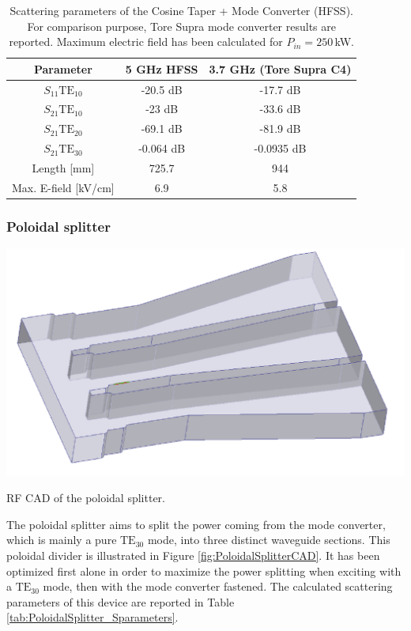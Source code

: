 \begin{table}[h]
	\begin{centering}
		\begin{tabular}{|c|c|c|}
			\hline 
			Parameter & \multicolumn{1}{c|}{5 GHz HFSS } & 3.7 GHz (Tore Supra C4) \tabularnewline
			\hline 
			\hline 
			$S_{11}$$\mbox{TE}_{10}$  & -20.5 dB  & -17.7 dB\tabularnewline
			\hline 
			$S_{21}$$\mbox{TE}_{10}$ & -23 dB  & -33.6 dB\tabularnewline
			\hline 
			$S_{21}$$\mbox{TE}_{20}$ & -69.1 dB  & -81.9 dB\tabularnewline
			\hline 
			$S_{21}$$\mbox{TE}_{30}$ & -0.064 dB  & -0.0935 dB\tabularnewline
			\hline 
			Length {[}mm{]} & \multicolumn{1}{c|}{725.7} & 944\tabularnewline
			\hline 
			Max. E-field {[}kV/cm{]} & \multicolumn{1}{c|}{6.9 } & 5.8\tabularnewline
			\hline 
		\end{tabular}
		\par\end{centering}
	
	\caption{Scattering parameters of the Cosine Taper + Mode Converter (HFSS). For comparison purpose, Tore Supra mode converter results are reported. Maximum electric field has been calculated for $P_{in}=250$\,kW.\label{tab:S-ParametersALL}}
\end{table}


\subsubsection{Poloidal splitter}
\begin{marginfigure}
	\includegraphics[width=1.0\textwidth]{figures/chap3/ITER_modeconverter/HFSS_PoloidalJunction}
	\caption{RF CAD of the poloidal splitter.}
	\label{fig:PoloidalSplitterCAD}
\end{marginfigure}
The poloidal splitter aims to split the power coming from the mode converter, which is mainly a pure $\mbox{TE}_{30}$ mode, into three distinct waveguide sections. This poloidal divider is illustrated in Figure \ref{fig:PoloidalSplitterCAD}. It has been optimized first alone in order to maximize the power splitting when exciting with a $\mbox{TE}_{30}$ mode, then with the mode converter fastened. The calculated scattering parameters of this device are reported in Table \ref{tab:PoloidalSplitter_Sparameters}.

